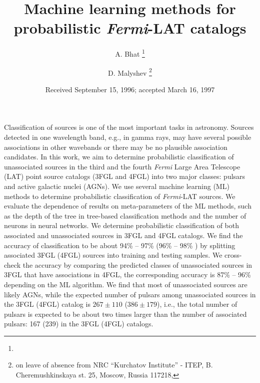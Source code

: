 \documentclass[preprint]{aa}
\newcommand{\Fermi}{\textit{Fermi}\xspace}
\begin{document}
 


   \title{Machine learning methods for probabilistic \Fermi-LAT catalogs}


   \author{A. Bhat \thanks{}
          \and
          D. Malyshev \thanks{on leave of absence from NRC ``Kurchatov Institute'' - ITEP, B. Cheremushkinskaya st. 25, Moscow, Russia 117218, 
          }
          }



   \date{Received September 15, 1996; accepted March 16, 1997}

 
\abstract
{
Classification of sources is one of the most important tasks in astronomy.
Sources detected in one wavelength band, e.g., in gamma rays, may have several possible associations in other wavebands or
there may be no plausible association candidates.
}
{
In this work, we aim to determine probabilistic classification of unassociated sources in the third and the fourth \Fermi Large Area Telescope (LAT) point source catalogs (3FGL and 4FGL) into two major classes: pulsars and active galactic nuclei (AGNs).
}
{
We use several machine learning (ML) methods to determine probabilistic classification of \Fermi-LAT sources.
We evaluate the dependence of results on meta-parameters of the ML methods, such as the depth of the tree in tree-based classification methods and the number of neurons in neural networks.
}
{
We determine probabilistic classification of both associated and unassociated sources in 3FGL and 4FGL catalogs.
We find the accuracy of classification to be about 94\% -- 97\% (96\% -- 98\% ) by splitting associated 3FGL (4FGL) sources into training and testing samples.
We cross-check the accuracy by comparing the predicted classes of unassociated sources in 3FGL that have associations in 4FGL,
the corresponding accuracy is 87\% -- 96\% depending on the ML algorithm.
We find that most of unassociated sources are likely AGNs, while the expected number of pulsars among unassociated sources in the 3FGL (4FGL) catalog is $267 \pm 110$ ($386 \pm 179$), i.e., the total number of pulsars is expected to be about two times larger than the number of associated pulsars: 167 (239) in the 3FGL (4FGL) catalogs.
}
{}
\end{document}

